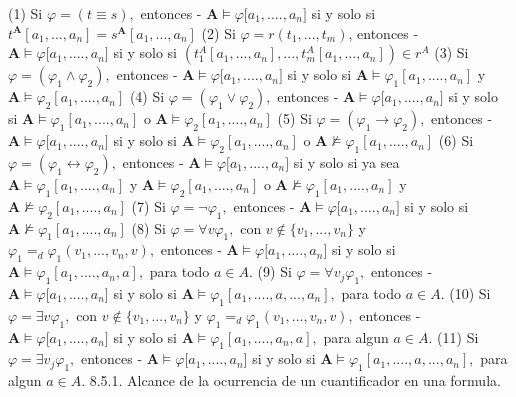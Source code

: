 (1) Si \(\varphi =(t\equiv s),\) entonces
- \(\mathbf{A}\models \varphi \lbrack a_{1},....,a_{n}]\) si y solo si \( t^{\mathbf{A}}[a_{1},...,a_{n}]=s^{\mathbf{A}}[a_{1},...,a_{n}]\)
(2) Si \(\varphi =r(t_{1},...,t_{m})\), entonces
- \(\mathbf{A}\models \varphi \lbrack a_{1},....,a_{n}]\) si y solo si \( (t_{1}^{A}[a_{1},...,a_{n}],...,t_{m}^{A}[a_{1},...,a_{n}])\in r^{A}\)
(3) Si \(\varphi =(\varphi _{1}\wedge \varphi _{2}),\) entonces
- \(\mathbf{A}\models \varphi \lbrack a_{1},....,a_{n}]\) si y solo si \( \mathbf{A}\models \varphi _{1}[a_{1},....,a_{n}]\) y \(\mathbf{A}\models \varphi _{2}[a_{1},....,a_{n}]\)
(4) Si \(\varphi =(\varphi _{1}\vee \varphi _{2}),\) entonces
- \(\mathbf{A}\models \varphi \lbrack a_{1},....,a_{n}]\) si y solo si \( \mathbf{A}\models \varphi _{1}[a_{1},....,a_{n}]\) o \(\mathbf{A}\models \varphi _{2}[a_{1},....,a_{n}]\)
(5) Si \(\varphi =(\varphi _{1}\rightarrow \varphi _{2}),\) entonces
- \(\mathbf{A}\models \varphi \lbrack a_{1},....,a_{n}]\) si y solo si \( \mathbf{A}\models \varphi _{2}[a_{1},....,a_{n}]\) o \(\mathbf{A}\not\models \varphi _{1}[a_{1},....,a_{n}]\)
(6) Si \(\varphi =(\varphi _{1}\leftrightarrow \varphi _{2}),\) entonces
- \(\mathbf{A}\models \varphi \lbrack a_{1},....,a_{n}]\) si y solo si ya sea \(\mathbf{A}\models \varphi _{1}[a_{1},....,a_{n}]\) y \(\mathbf{A} \models \varphi _{2}[a_{1},....,a_{n}]\) o \(\mathbf{A}\not\models \varphi _{1}[a_{1},....,a_{n}]\) y \(\mathbf{A}\not\models \varphi _{2}[a_{1},....,a_{n}]\)
(7) Si \(\varphi =\lnot \varphi _{1},\) entonces
- \(\mathbf{A}\models \varphi \lbrack a_{1},....,a_{n}]\) si y solo si \( \mathbf{A}\not\models \varphi _{1}[a_{1},....,a_{n}]\)
(8) Si \(\varphi =\forall v\varphi _{1},\) con \(v\not\in \{v_{1},...,v_{n}\}\) y \(\varphi _{1}=_{d}\varphi _{1}(v_{1},...,v_{n},v),\) entonces
- \(\mathbf{A}\models \varphi \lbrack a_{1},....,a_{n}]\) si y solo si \( \mathbf{A}\models \varphi _{1}[a_{1},....,a_{n},a],\) para todo \(a\in A.\)
(9) Si \(\varphi =\forall v_{j}\varphi _{1},\) entonces
- \(\mathbf{A}\models \varphi \lbrack a_{1},....,a_{n}]\) si y solo si \( \mathbf{A}\models \varphi _{1}[a_{1},....,a,...,a_{n}],\) para todo \(a\in A.\)
(10) Si \(\varphi =\exists v\varphi _{1},\) con \(v\not\in \{v_{1},...,v_{n}\}\) y \(\varphi _{1}=_{d}\varphi _{1}(v_{1},...,v_{n},v),\) entonces
- \(\mathbf{A}\models \varphi \lbrack a_{1},....,a_{n}]\) si y solo si \( \mathbf{A}\models \varphi _{1}[a_{1},....,a_{n},a],\) para algun \(a\in A.\)
(11) Si \(\varphi =\exists v_{j}\varphi _{1},\) entonces
- \(\mathbf{A}\models \varphi \lbrack a_{1},....,a_{n}]\) si y solo si \( \mathbf{A}\models \varphi _{1}[a_{1},....,a,...,a_{n}],\) para algun \(a\in A.\)
8.5.1. Alcance de la ocurrencia de un cuantificador en una formula.

